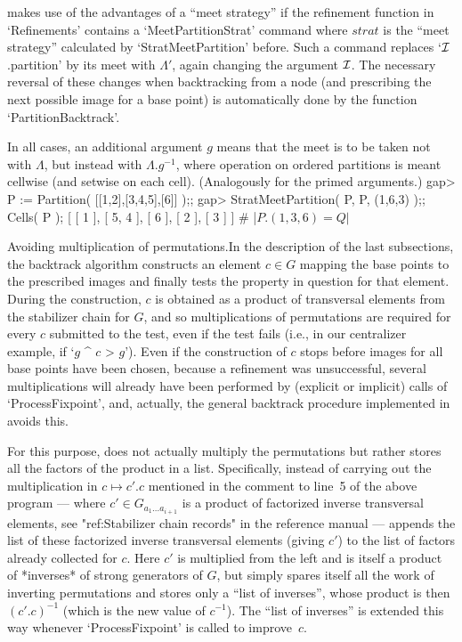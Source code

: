 {\GAP} makes use   of  the advantages  of   a ``meet  strategy''  if  the
refinement   function  in `Refinements'  contains  a `MeetPartitionStrat'
command where   $strat$  is   the    ``meet  strategy''  calculated    by
`StratMeetPartition' before.  Such a command replaces `${\cal I}$.partition' by
its meet with $\Lambda'$, again changing the argument ${\cal I}$. The necessary
reversal of these changes when backtracking from  a node (and prescribing
the next possible image  for a base point) is  automatically done by  the
function `PartitionBacktrack'.

In  all cases, an additional  argument $g$ means that the   meet is to be
taken  not with $\Lambda$,   but  instead with $\Lambda.{g^{-1}}$,  where
operation  on ordered partitions is  meant cellwise  (and setwise on each
cell). (Analogously for the primed arguments.)
\beginexample
    gap> P := Partition( [[1,2],[3,4,5],[6]] );;
    gap> StratMeetPartition( P, P, (1,6,3) );;  Cells( P );
    [ [ 1 ], [ 5, 4 ], [ 6 ], [ 2 ], [ 3 ] ]  # |$P.(1,3,6) = Q|$
\endexample

\medskip
{\bsf Avoiding multiplication  of permutations.}\quad In the  description
of  the last subsections, the  backtrack  algorithm constructs an element
$c\in G$ mapping  the base points   to the prescribed images  and finally
tests the property in question for that element. During the construction,
$c$ is obtained as a product  of transversal elements from the stabilizer
chain for $G$,  and so multiplications  of permutations are required  for
every $c$  submitted to the test,  even if the  test fails (i.e.,  in our
centralizer example, if `$g$ ^ $c$ \<> $g$'). Even if the construction of
$c$ stops before images  for all base  points have been chosen, because a
refinement was unsuccessful,  several  multiplications will  already have
been performed by (explicit or implicit) calls of `ProcessFixpoint', and,
actually, the general   backtrack procedure implemented in  {\GAP} avoids
this.

For this purpose, {\GAP} does  not actually multiply the permutations but
rather stores  all the factors of the   product in a  list. Specifically,
instead of carrying out  the multiplication in $c\mapsto c'.c$  mentioned
in  the   comment  to  line~5 of  the   above  program   --- where $c'\in
G_{a_1\ldots  a_{i+1}}$ is a  product  of factorized inverse  transversal
elements, see "ref:Stabilizer chain records" in the reference manual  ---
{\GAP} appends the list of these factorized inverse transversal  elements
(giving $c'$) to the list of factors already collected for $c$. Here $c'$
is multiplied from the left and is itself  a  product  of  *inverses*  of
strong generators of $G$, but {\GAP} simply spares itself all the work of
inverting permutations and stores only  a  ``list  of  inverses'',  whose
product is then $(c'.c)^{-1}$ (which is the new value of  $c^{-1}$).  The
``list of inverses'' is extended this way whenever  `ProcessFixpoint'  is
called to improve~$c$.

